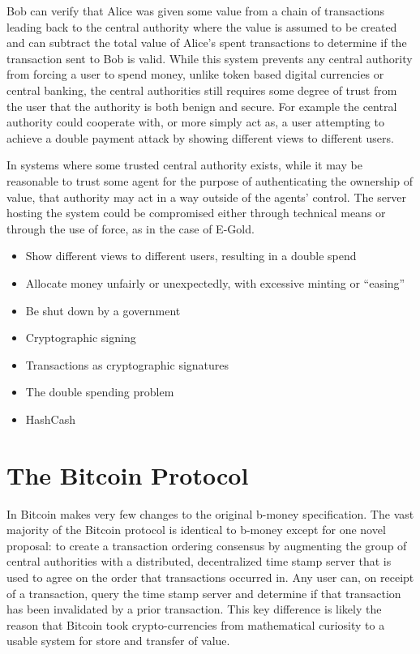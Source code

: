 Bob can verify that Alice was given some value from a chain of transactions leading back to the central authority where the value is assumed to be created and can subtract the total value of Alice's spent transactions to determine if the transaction sent to Bob is valid.  While this system prevents any central authority from forcing a user to spend money, unlike token based digital currencies or central banking, the central authorities still requires some degree of trust from the user that the authority is both benign and secure. For example the central authority could cooperate with, or more simply act as, a user attempting to achieve a double payment attack by showing different views to different users.


In systems where some trusted central authority exists, while it may be reasonable to trust some agent for the purpose of authenticating the ownership of value, that authority may act in a way outside of the agents' control.  The server hosting the system could be compromised either through technical means or through the
use of force, as in the case of E-Gold.

\begin{itemize} \item Show different views to different users, resulting in a
        double spend \item Allocate money unfairly or unexpectedly, with
        excessive minting or ``easing'' \item Be shut down by a government \item
        Cryptographic signing \item Transactions as cryptographic signatures
        \item The double spending problem \item HashCash \end{itemize}

\section{The Bitcoin Protocol}
In Bitcoin \textcite{satoshi} makes very few changes to the original b-money\cite{b-money} specification.  The vast majority of the Bitcoin protocol is identical to b-money except for one novel proposal: to create a transaction ordering consensus by augmenting the group of central authorities with a distributed, decentralized time stamp server that is used to agree on the order that transactions occurred in.  Any user can, on receipt of a transaction, query the time stamp server and determine if that transaction has been invalidated by a prior transaction. This key difference is likely the reason that Bitcoin took crypto-currencies from mathematical curiosity to a usable system for store and transfer of value.

